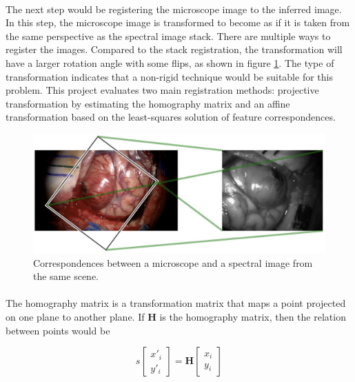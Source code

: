 \documentclass[12pt,oneside]{report}
\begin{document}
\paragraph{}
The next step would be registering the microscope image to the inferred image. In this step, the microscope image is transformed to become as if it is taken from the same perspective as the spectral image stack. There are multiple ways to register the images. Compared to the stack registration, the transformation will have a larger rotation angle with some flips, as shown in figure \ref{fig:pers-corr}. The type of transformation indicates that a non-rigid technique would be suitable for this problem. This project evaluates two main registration methods: projective transformation by estimating the homography matrix and an affine transformation based on the least-squares solution of feature correspondences.

\begin{figure}[h]
\centering
\begin{minipage}[h]{0.9\textwidth}
    \centering
    \includegraphics[width=\textwidth]{figures/pers-corr.png}
    \caption{Correspondences between a microscope and a spectral image from the same scene.}
    \label{fig:pers-corr}
\end{minipage}
\end{figure}

\paragraph{}
The homography matrix is a transformation matrix that maps a point projected on one plane to another plane. If $\textbf{H}$ is the homography matrix, then the relation between points would be

\begin{equation}
    s
    \begin{bmatrix}
    x'_i \\ y'_i
    \end{bmatrix}
    =
    \textbf{H}
    \begin{bmatrix}
    x_i \\ y_i
    \end{bmatrix}
\end{equation}
\end{document}
